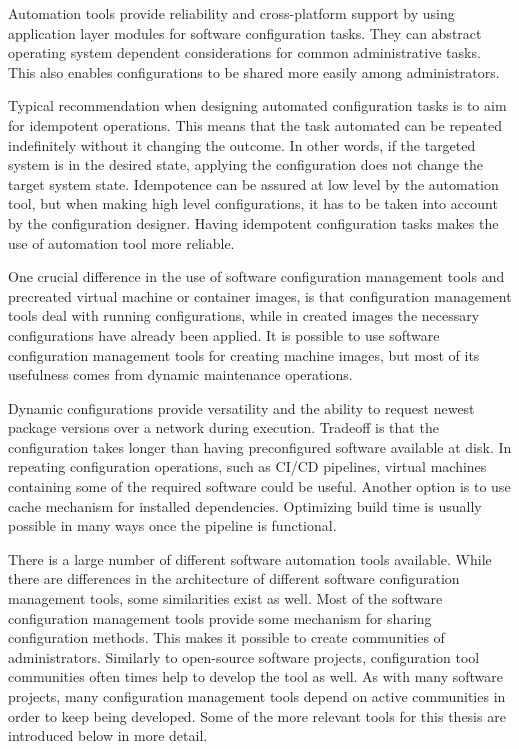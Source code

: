 \documentclass[officiallayout]{tktla}
\begin{document}
Automation tools provide reliability and cross-platform support by using
application layer modules for software configuration tasks. They can abstract
operating system dependent considerations for common administrative tasks. This
also enables configurations to be shared more easily among administrators.

Typical recommendation when designing automated configuration tasks is to aim
for idempotent operations. This means that the task automated can be repeated
indefinitely without it changing the outcome. In other words, if the targeted
system is in the desired state, applying the configuration does not change the
target system state. Idempotence can be assured at low level by the automation
tool, but when making high level configurations, it has to be taken into
account by the configuration designer. Having idempotent configuration tasks
makes the use of automation tool more reliable.

One crucial difference in the use of software configuration management tools
and precreated virtual machine or container images, is that configuration
management tools deal with running configurations, while in created images the
necessary configurations have already been applied. It is possible to use
software configuration management tools for creating machine images, but most
of its usefulness comes from dynamic maintenance operations.

Dynamic configurations provide versatility and the ability to request newest
package versions over a network during execution. Tradeoff is that the
configuration takes longer than having preconfigured software available at
disk. In repeating configuration operations, such as CI/CD pipelines, virtual
machines containing some of the required software could be useful. Another
option is to use cache mechanism for installed dependencies. Optimizing build
time is usually possible in many ways once the pipeline is functional.

There is a large number of different software automation tools available. While
there are differences in the architecture of different software configuration
management tools, some similarities exist as well. Most of the software
configuration management tools provide some mechanism for sharing configuration
methods. This makes it possible to create communities of administrators.
Similarly to open-source software projects, configuration tool communities
often times help to develop the tool as well. As with many software projects,
many configuration management tools depend on active communities in order to
keep being developed. Some of the more relevant tools for this thesis are
introduced below in more detail.
\end{document}
